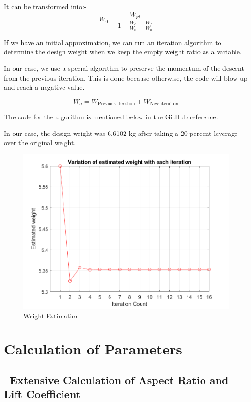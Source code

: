 \documentclass[12 pt]{article}
\begin{document}
It can be transformed into:- 
$$W_{0} = \frac{W_{pl}}{1 - \frac{W_{e}}{W_{0}} - \frac{W_{f}}{W_0}}$$

If we have an initial approximation, we can run an iteration algorithm to determine the design weight when we keep the empty weight ratio as a variable.


In our case, we use a special algorithm to preserve the momentum of the descent from the previous iteration. This is done because otherwise, the code will blow up and reach a negative value. 

$$ W_o = W_{\text{Previous iteration}} + W_{\text{New iteration}} $$

The code for the algorithm is mentioned below in the GitHub reference.

In our case, the design weight was 6.6102 kg after taking a 20 percent leverage over the original weight.

\begin{figure}
    \centering
    \includegraphics[width=0.75\linewidth]{Codes/Week 2/weight.png}
    \caption{Weight Estimation}
    \label{Weight Estimation}
\end{figure}

\vfill

\newpage

\section{Calculation of Parameters}

\subsection{\ Extensive Calculation of Aspect Ratio and Lift Coefficient}
\end{document}
